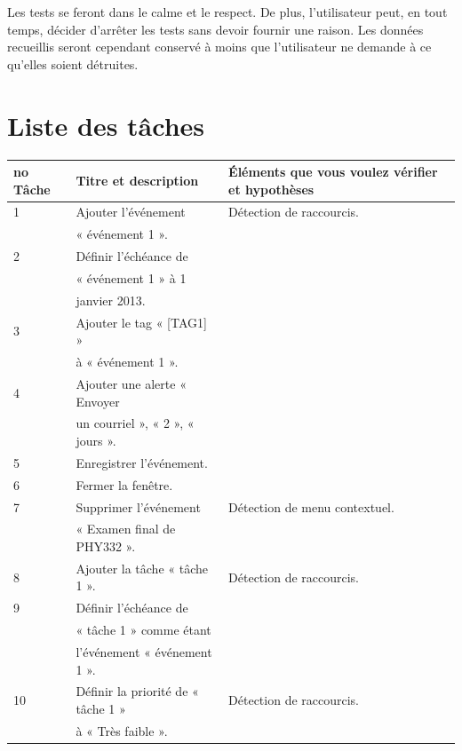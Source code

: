 \documentclass[letterpaper, oneside, 12pt, these, creativecommons]{thETS}
\begin{document}
Les tests se feront dans le calme et le respect. De plus, l'utilisateur peut, en tout temps, décider d'arrêter les tests sans devoir fournir une raison. Les données recueillis seront cependant conservé à moins que l'utilisateur ne demande à ce qu'elles soient détruites.

\newpage

\section{Liste des tâches}

\begin{table}
	\centering
	\begin{tabular}{|l|l|l|}
		\hline
		no Tâche	& Titre et description		& Éléments que vous voulez vérifier et hypothèses 	\\ \hline 
		1		& Ajouter l'événement 		&  Détection de raccourcis.				\\ 
				& « événement 1 ».			&								\\ \hline
		2		& Définir l’échéance de 		&								\\
				& « événement 1 » à 1 		&								\\
				& janvier 2013.			&								\\ \hline
		3		& Ajouter le tag « [TAG1] » 	&								\\
				& à « événement 1 ».		&								\\ \hline
		4		& Ajouter une alerte « Envoyer 	&								\\
				& un courriel », « 2 », « jours ».	&								\\ \hline
		5		& Enregistrer l’événement.	& 								\\ \hline
		6		& Fermer la fenêtre.		&								\\ \hline
		7		& Supprimer l’événement		& Détection de menu contextuel.				\\
				&  « Examen final de PHY332 ».	& 								\\ \hline
		8		& Ajouter la tâche « tâche 1 ». 	& Détection de raccourcis.					\\ \hline
		9		& Définir l’échéance de  		&								\\
				& « tâche 1 » comme étant	&								\\
				&  l’événement « événement 1 ».	&								\\ \hline
		10		& Définir la priorité de  « tâche 1 »& Détection de raccourcis.				\\
				&  à « Très faible ». 		&								\\

\end{tabular}
\end{table}
\end{document}
